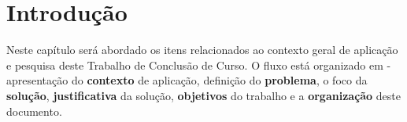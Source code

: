 \chapter{Introdução}
\label{chap:intro}

Neste capítulo será abordado os itens relacionados ao contexto geral de
aplicação e pesquisa deste Trabalho de Conclusão de Curso. O fluxo está
organizado em - apresentação do \textbf{contexto} de aplicação, definição do
\textbf{problema}, o foco da \textbf{solução}, \textbf{justificativa} da solução, \textbf{objetivos}
do trabalho e a \textbf{organização} deste documento.
